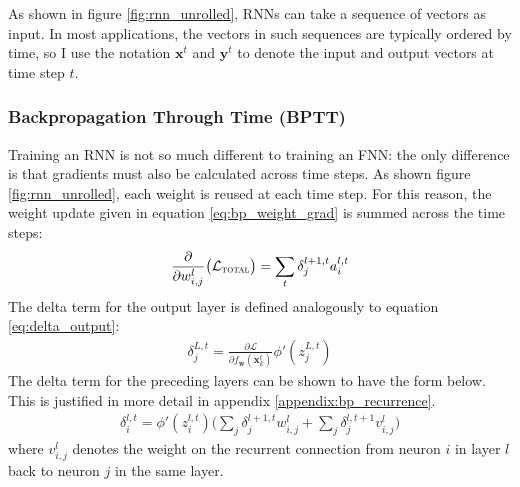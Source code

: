 \documentclass[a4paper, 12pt]{report}
\begin{document}
As shown in figure \ref{fig:rnn_unrolled}, RNNs can take a sequence of vectors as input. In most applications, the vectors in such sequences are typically ordered by time, so I use the notation $\mathbf{x}^t$ and $\mathbf{y}^t$ to denote the input and output vectors at time step $t$.

\subsubsection{Backpropagation Through Time (BPTT)}

Training an RNN is not so much different to training an FNN: the only difference is that gradients must also be calculated across time steps. As shown figure \ref{fig:rnn_unrolled}, each weight is reused at each time step. For this reason, the weight update given in equation \ref{eq:bp_weight_grad} is summed across the time steps:
\begin{gather*}
	\frac{\partial}{\partial w_{i,j}^l} \big( \mathcal{L}_{\text{\scshape total}} \big) = \sum_t \delta_j^{l+1,t} a_i^{l,t}
\end{gather*}
The delta term for the output layer is defined analogously to equation \ref{eq:delta_output}:
\begin{gather} \label{eq:delta_output}
	\delta_j^{L,t} = \frac{\partial \mathcal{L}}{\partial f_{\mathbf{w}}(\mathbf{x}_k^t)} \phi'(z_j^{L,t})
\end{gather}
The delta term for the preceding layers can be shown to have the form below. This is justified in more detail in appendix \ref{appendix:bp_recurrence}.
\begin{gather} \label{eq:delta_hidden}
	\delta_i^{l,t} = \phi'(z_i^{l,t}) \big( \sum_j \delta_j^{l+1,t} w_{i,j}^l + \sum_j \delta_j^{l,t+1} v_{i,j}^l \big)
\end{gather}
where $v_{i,j}^l$ denotes the weight on the recurrent connection from neuron $i$ in layer $l$ back to neuron $j$ in the same layer.
\end{document}
